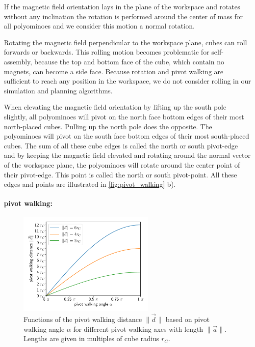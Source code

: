 If the magnetic field orientation lays in the plane of the workspace and rotates without any inclination the rotation is performed around the center of mass for all polyominoes and we consider this motion a normal rotation.

Rotating the magnetic field perpendicular to the workspace plane, cubes can roll forwards or backwards.
This rolling motion becomes problematic for self-assembly, because the top and bottom face of the cube, which contain no magnets, can become a side face.
Because rotation and pivot walking are sufficient to reach any position in the workspace, we do not consider rolling in our simulation and planning algorithms.

When elevating the magnetic field orientation by lifting up the south pole slightly, all polyominoes will pivot on the north face bottom edges of their most north-placed cubes.
Pulling up the north pole does the opposite. The polyominoes will pivot on the south face bottom edges of their most south-placed cubes.
The sum of all these cube edges is called the north or south pivot-edge and by keeping the magnetic field elevated and rotating around the normal vector of the workspace plane, the polyominoes will rotate around the center point of their pivot-edge.
This point is called the north or south pivot-point.
All these edges and points are illustrated in \autoref{fig:pivot_walking} b).


\paragraph{pivot walking:}

\begin{figure}
	\centering
	\includegraphics[width=0.60\textwidth]{figures/plots/pivot_walking_angle.pdf}
	\caption[Functions of $\lVert \vec{d} \rVert$ based on $\alpha$ for different $\lVert \vec{a} \rVert$]{Functions of the pivot walking distance $\lVert \vec{d} \rVert$ based on pivot walking angle $\alpha$ for different pivot walking axes with length $\lVert \vec{a} \rVert$. Lengths are given in multiples of cube radius $r_C$.}
	\label{fig:pw_angle_plot}
\end{figure}

